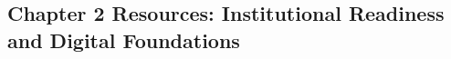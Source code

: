 \begin{refsection}
\chapter{Chapter 2 Resources: Institutional Readiness and Digital Foundations}
\label{chap:comp-ch02}



\printbibliography[heading=subbibliography,title={Chapter 2 References}]
\end{refsection}
